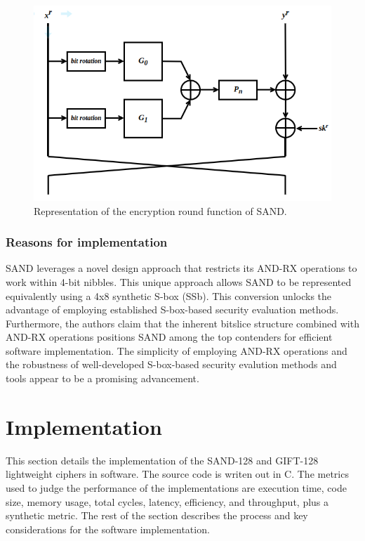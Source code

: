 \documentclass[conference]{IEEEtran}
\begin{document}
\begin{figure}
    \centering
    \includegraphics[width=0.9\columnwidth]{figures/SAND-ROUND.png}
    \caption{Representation of the encryption round function of SAND\cite{SAND}.}
    \label{fig:SAND-}
\end{figure}


\subsubsection{Reasons for implementation}
SAND leverages a novel design approach that restricts its AND-RX operations to work within 4-bit nibbles. This unique approach allows SAND to be represented equivalently using a 4x8 synthetic S-box (SSb). This conversion unlocks the advantage of employing established S-box-based security evaluation methods. Furthermore, the authors claim that the inherent bitslice structure combined with AND-RX operations positions SAND among the top contenders for efficient software implementation. The simplicity of employing AND-RX operations and the robustness of well-developed S-box-based security evalution methods and tools appear to be a promising advancement.

\section{Implementation}\label{sec:imp}

This section details the implementation of the SAND-128 and GIFT-128 lightweight ciphers in software. The source code is writen out in C. The metrics used to judge the performance of the implementations are execution time, code size, memory usage, total cycles, latency, efficiency, and throughput, plus a synthetic metric. The rest of the section describes the process and key considerations for the software implementation.
\end{document}
